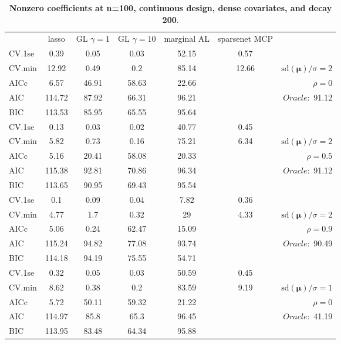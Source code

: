 \clearpage
\begin{table}\vspace{-.5cm}
\caption[l]{ { \bf Nonzero coefficients at n=100, continuous design, 
dense covariates, and  decay  200}.}
\vspace{-.5cm}
\footnotesize{}
\begin{center}
\begin{tabular}{l*{5}{c}|r}
& lasso & GL $\gamma=1$ & GL $\gamma=10$ & marginal AL & sparsenet MCP  & \\
 \cline{1-7}
CV.1se & 0.39 & 0.05 & 0.03 & 52.15 & 0.57 & \\
CV.min & 12.92 & 0.49 & 0.2 & 85.14 & 12.66 &  $\mathrm{sd}(\mathbf{\mu})/\sigma=2$ \\
AICc & 6.57 & 46.91 & 58.63 & 22.66 & & $\rho=0$ \\
AIC & 114.72 & 87.92 & 66.31 & 96.21 & &  \multirow{2}{*}{$Oracle: $ 91.12} \\
BIC & 113.53 & 85.95 & 65.55 & 95.64 & &  \\
 \hline 
CV.1se & 0.13 & 0.03 & 0.02 & 40.77 & 0.45 & \\
CV.min & 5.82 & 0.73 & 0.16 & 75.21 & 6.34 &  $\mathrm{sd}(\mathbf{\mu})/\sigma=2$ \\
AICc & 5.16 & 20.41 & 58.08 & 20.33 & & $\rho=0.5$ \\
AIC & 115.38 & 92.81 & 70.86 & 96.34 & &  \multirow{2}{*}{$Oracle: $ 91.12} \\
BIC & 113.65 & 90.95 & 69.43 & 95.54 & &  \\
 \hline 
CV.1se & 0.1 & 0.09 & 0.04 & 7.82 & 0.36 & \\
CV.min & 4.77 & 1.7 & 0.32 & 29 & 4.33 &  $\mathrm{sd}(\mathbf{\mu})/\sigma=2$ \\
AICc & 5.06 & 0.24 & 62.47 & 15.09 & & $\rho=0.9$ \\
AIC & 115.24 & 94.82 & 77.08 & 93.74 & &  \multirow{2}{*}{$Oracle: $ 90.49} \\
BIC & 114.18 & 94.19 & 75.55 & 54.71 & &  \\
 \hline 
CV.1se & 0.32 & 0.05 & 0.03 & 50.59 & 0.45 & \\
CV.min & 8.62 & 0.38 & 0.2 & 83.59 & 9.19 &  $\mathrm{sd}(\mathbf{\mu})/\sigma=1$ \\
AICc & 5.72 & 50.11 & 59.32 & 21.22 & & $\rho=0$ \\
AIC & 114.97 & 85.8 & 65.3 & 96.45 & &  \multirow{2}{*}{$Oracle: $ 41.19} \\
BIC & 113.95 & 83.48 & 64.34 & 95.88 & &  \\

\end{tabular}
\end{center}
\end{table}
